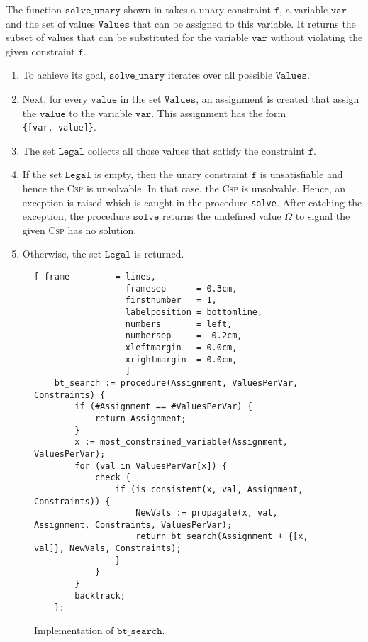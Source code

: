 The function $\texttt{solve\_unary}$ shown in  takes a unary
constraint $\texttt{f}$, a variable $\texttt{var}$ and the set of values $\texttt{Values}$ that can be assigned to this
variable.  It returns the subset of values that can be substituted for the variable $\texttt{var}$
without violating the given constraint $\texttt{f}$.
\begin{enumerate}
\item To achieve its goal, $\texttt{solve\_unary}$ iterates over all possible $\texttt{Values}$.  
\item Next, for every $\texttt{value}$ in the set $\texttt{Values}$, an assignment is created that assign
      the $\texttt{value}$ to the variable $\texttt{var}$.  This assignment has the form
      \\[0.2cm]
      \hspace*{1.3cm}
      \texttt{\{[var, value]\}}.
\item The set $\texttt{Legal}$ collects all those values that satisfy the constraint $\texttt{f}$.
\item If the set $\texttt{Legal}$ is empty, then the unary constraint $\texttt{f}$ is unsatisfiable and hence
      the \textsc{Csp} is unsolvable.  In that case, the \textsc{Csp} is unsolvable.
      Hence, an exception is raised which is caught in the procedure \texttt{solve}.
      After catching the exception, the procedure $\mathtt{solve}$ returns the undefined value $\Omega$ 
      to signal the given \textsc{Csp} has no solution. 
\item Otherwise, the set  $\texttt{Legal}$ is returned.
\end{enumerate}

\begin{figure}[!ht]
\centering
\begin{Verbatim}[ frame         = lines, 
                  framesep      = 0.3cm, 
                  firstnumber   = 1,
                  labelposition = bottomline,
                  numbers       = left,
                  numbersep     = -0.2cm,
                  xleftmargin   = 0.0cm,
                  xrightmargin  = 0.0cm,
                  ]
    bt_search := procedure(Assignment, ValuesPerVar, Constraints) {
        if (#Assignment == #ValuesPerVar) {
            return Assignment;
        }
        x := most_constrained_variable(Assignment, ValuesPerVar);
        for (val in ValuesPerVar[x]) {
            check {
                if (is_consistent(x, val, Assignment, Constraints)) {
                    NewVals := propagate(x, val, Assignment, Constraints, ValuesPerVar);
                    return bt_search(Assignment + {[x, val]}, NewVals, Constraints);
                }
            }
        }
        backtrack;
    };
\end{Verbatim}
\vspace*{-0.3cm}
\caption{Implementation of $\texttt{bt\_search}$.}
\label{fig:csp-constraint-propagation.stlx:bt_search}
\end{figure}

